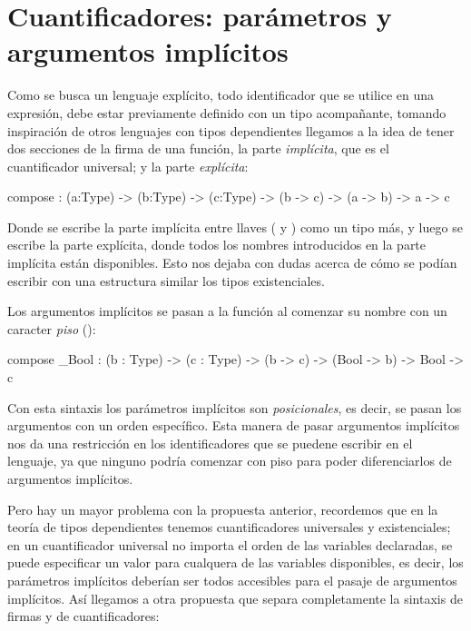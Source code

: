 \section{Cuantificadores: parámetros y argumentos implícitos}

\begin{blueleft}
Como se busca un lenguaje explícito, todo identificador que se utilice en una expresión, debe estar previamente definido con un tipo acompañante, tomando inspiración de otros lenguajes con tipos dependientes llegamos a la idea de tener dos secciones de la firma de una función, la parte \emph{implícita}, que es el cuantificador universal; y la parte \emph{explícita}:

\begin{anglercode}
compose : { (a:Type) -> (b:Type) -> (c:Type) } -> (b -> c) -> (a -> b) -> a -> c
\end{anglercode}

Donde se escribe la parte implícita entre llaves (\inlinecode{\{} y \inlinecode{\}}) como un tipo más, y luego se escribe la parte explícita, donde todos los nombres introducidos en la parte implícita están disponibles. Esto nos dejaba con dudas acerca de cómo se podían escribir con una estructura similar los tipos existenciales.

Los argumentos implícitos se pasan a la función al comenzar su nombre con un caracter \emph{piso} (\inlinecode{\_}):

\begin{anglercode}
compose _Bool : { (b : Type) -> (c : Type) } -> (b -> c) -> (Bool -> b) -> Bool -> c
\end{anglercode}

Con esta sintaxis los parámetros implícitos son \emph{posicionales}, es decir, se pasan los argumentos con un orden específico. Esta manera de pasar argumentos implícitos nos da una restricción en los identificadores que se puedene escribir en el lenguaje, ya que ninguno podría comenzar con piso para poder diferenciarlos de argumentos implícitos.

Pero hay un mayor problema con la propuesta anterior, recordemos que en la teoría de tipos dependientes tenemos cuantificadores universales y existenciales; en un cuantificador universal no importa el orden de las variables declaradas, se puede especificar un valor para cualquera de las variables disponibles, es decir, los parámetros implícitos deberían ser todos accesibles para el pasaje de argumentos implícitos. Así llegamos a otra propuesta que separa completamente la sintaxis de firmas y de cuantificadores:


\end{blueleft}
